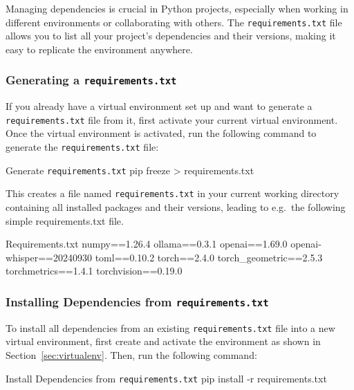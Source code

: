 Managing dependencies is crucial in Python projects, especially when working in different environments or collaborating with others. The \texttt{requirements.txt} file allows you to list all your project’s dependencies and their versions, making it easy to replicate the environment anywhere.

%
\subsubsection{Generating a \texttt{requirements.txt}}

If you already have a virtual environment set up and want to generate a \texttt{requirements.txt} file from it, first activate your current virtual environment. Once the virtual environment is activated, run the following command to generate the \texttt{requirements.txt} file:

\begin{codeonly}{Generate \texttt{requirements.txt}}
pip freeze > requirements.txt
\end{codeonly}

This creates a file named \texttt{requirements.txt} in your current working directory containing all installed packages and their versions, leading to e.g.\ the following simple requirements.txt file. 

\begin{codeonly}{Requirements.txt}
numpy==1.26.4
ollama==0.3.1
openai==1.69.0
openai-whisper==20240930
toml==0.10.2
torch==2.4.0
torch_geometric==2.5.3
torchmetrics==1.4.1
torchvision==0.19.0
\end{codeonly}

%
\subsubsection{Installing Dependencies from \texttt{requirements.txt}}

To install all dependencies from an existing \texttt{requirements.txt} file into a new virtual environment, first create and activate the environment as shown in Section~\ref{sec:virtualenv}. Then, run the following command:

\begin{codeonly}{Install Dependencies from \texttt{requirements.txt}}
pip install -r requirements.txt
\end{codeonly}

